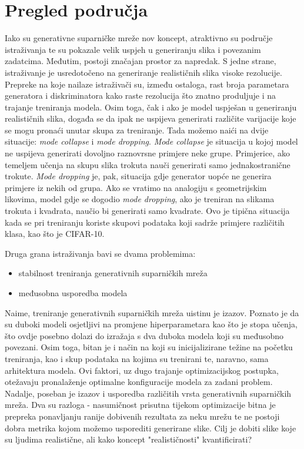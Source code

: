 \chapter{Pregled područja}
Iako su generativne suparničke mreže nov koncept, atraktivno su područje istraživanja te su pokazale velik uspjeh u generiranju slika i povezanim zadatcima. Međutim, postoji značajan prostor za napredak. S jedne strane, istraživanje je usredotočeno na generiranje realističnih slika visoke rezolucije. Prepreke na koje nailaze istraživači su, između ostaloga, rast broja parametara generatora i diskriminatora kako raste rezolucija što znatno produljuje i na trajanje treniranja modela. Osim toga, čak i ako je model uspješan u generiranju realističnih slika, događa se da ipak ne uspijeva generirati različite varijacije koje se mogu pronaći unutar skupa za treniranje. Tada možemo naići na dvije situacije: \textit{mode collapse} i \textit{mode dropping}. \textit{Mode collapse} je situacija u kojoj model ne uspijeva generirati dovoljno raznovrsne primjere neke grupe. Primjerice, ako temeljem učenja na skupu slika trokuta nauči generirati samo jednakostranične trokute. \textit{Mode dropping} je, pak, situacija gdje generator uopće ne generira primjere iz nekih od grupa. Ako se vratimo na analogiju s geometrijskim likovima, model gdje se dogodio \textit{mode dropping}, ako je treniran na slikama trokuta i kvadrata, naučio bi generirati samo kvadrate. Ovo je tipična situacija kada se pri treniranju koriste skupovi podataka koji sadrže primjere različitih klasa, kao što je CIFAR-10.

Druga grana istraživanja bavi se dvama problemima:
\begin{itemize}
	\item stabilnost treniranja generativnih suparničkih mreža
	\item međusobna usporedba modela
\end{itemize}
Naime, treniranje generativnih suparničkih mreža uistinu je izazov. Poznato je da su duboki modeli osjetljivi na promjene hiperparametara kao što je stopa učenja, što ovdje posebno dolazi do izražaja s dva duboka modela koji su međusobno povezani. Osim toga, bitan je i način na koji su inicijalizirane težine na početku treniranja, kao i skup podataka na kojima su trenirani te, naravno, sama arhitektura modela. Ovi faktori, uz dugo trajanje optimizacijskog postupka, otežavaju pronalaženje optimalne konfiguracije modela za zadani problem. Nadalje, poseban je izazov i usporedba različitih vrsta generativnih suparničkih mreža. Dva su razloga - nasumičnost prisutna tijekom optimizacije bitna je prepreka ponavljanju ranije dobivenih rezultata za neku mrežu te ne postoji dobra metrika kojom možemo usporediti generirane slike. Cilj je dobiti slike koje su ljudima realistične, ali kako koncept "realističnosti" kvantificirati?

